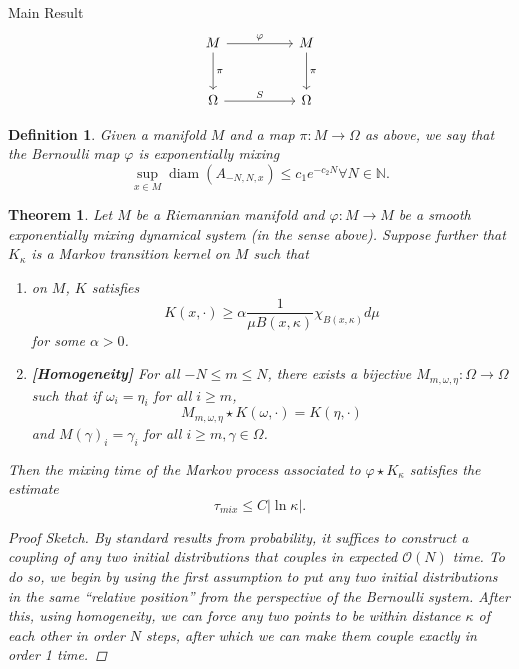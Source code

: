 \documentclass[final,noamsthm]{beamer}
\newtheorem{thm}{Theorem}
\newtheorem{defn}[ex]{Definition}
\newcommand{\N}{\mathbb{N}}
\DeclareMathOperator{\diam}{{diam}}
\newcommand{\abs}[1]{\left\vert #1\right\vert}
\newlength{\colwidth}
\begin{document}
\begin{frame}[t]
\begin{columns}[t]
\begin{column}{\colwidth}
\begin{block}{Main Result}
    \[
        \begin{tikzcd}[row sep=large,column sep=huge,ampersand replacement=\&]
        M  \ar[d, "\pi"] \ar[r, "\varphi"]\& M \ar[d, "\pi"]\\
        \Omega \ar[r, "S"] \& \Omega
        \end{tikzcd}
    \]
\begin{defn}
  Given a manifold $M$ and a map $\pi: M \to \Omega$ as above, we say that the Bernoulli map $\varphi$ is exponentially mixing
    \[
        \sup_{x \in M} \diam(A_{-N,N,x}) \le c_1 e^{-c_2 N}
    \forall N \in \N.
    \]
\end{defn}


                \begin{thm}
Let $M$ be a Riemannian manifold and $\varphi: M \to M$ be a smooth exponentially mixing dynamical system (in the sense above).
			Suppose further that $K_\kappa$ is a Markov transition kernel on $M$ such that
            \begin{enumerate}
        \item on $M$, $K$ satisfies
      \begin{equation*}
        K(x, \cdot) \geq \alpha \frac{1}{\mu{B(x, \kappa)}} \chi_{B(x, \kappa)} d \mu
      \end{equation*}
      for some $\alpha > 0$.%
        \item \textbf{[Homogeneity]} For all $-N \le m \le N$, there exists a bijective $M_{m,\omega, \eta}: \Omega \to \Omega$ such that if $\omega_i = \eta_i$ for all $i \ge m$,
            \[
                M_{m,\omega, \eta} \star K(\omega,\cdot) = K(\eta, \cdot)
            \]
            and $M(\gamma)_i = \gamma_i$ for all $i \ge m, \gamma \in \Omega$.
       \end{enumerate}
			Then the mixing time of the Markov process associated to $\varphi \star K_\kappa$ satisfies the estimate
			\[
				\tau_{mix} \le C\abs{\ln \kappa}.
			\]
            \begin{proof}[Proof Sketch]
                By standard results from probability, it suffices to construct a coupling of any two initial distributions that couples in expected $\mathcal{O}(N)$ time.
                To do so, we begin by using the first assumption to put any two initial distributions in the same ``relative position'' from the perspective of the Bernoulli system.
                After this, using homogeneity, we can force any two points to be within distance $\kappa$ of each other in order $N$ steps, after which we can make them couple exactly in order 1 time.
            \end{proof}


\end{thm}
\end{block}
\end{column}
\end{columns}
\end{frame}
\end{document}
